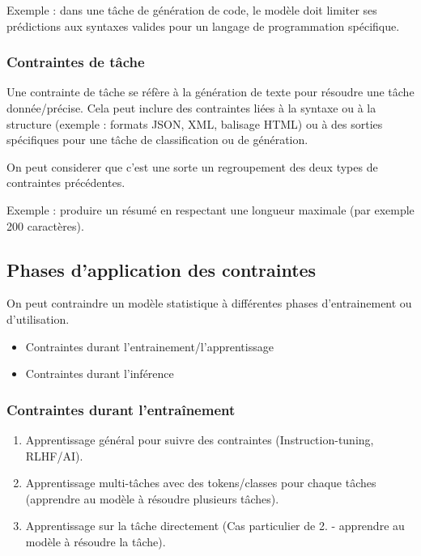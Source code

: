 Exemple : dans une tâche de génération de code, le modèle doit limiter
ses prédictions aux syntaxes valides pour un langage de programmation
spécifique.

\subsubsection{Contraintes de tâche}\label{contraintes-de-tuxe2che}

Une contrainte de tâche se réfère à la génération de texte pour résoudre
une tâche donnée/précise. Cela peut inclure des contraintes liées à la
syntaxe ou à la structure (exemple : formats JSON, XML, balisage HTML)
ou à des sorties spécifiques pour une tâche de classification ou de
génération.

On peut considerer que c'est une sorte un regroupement des deux types de
contraintes précédentes.

Exemple : produire un résumé en respectant une longueur maximale (par
exemple 200 caractères).

\subsection{Phases d'application des contraintes}\label{phases-dapplication-des-contraintes}

On peut contraindre un modèle statistique à différentes phases
d'entrainement ou d'utilisation.

\begin{itemize}
\tightlist
\item
  Contraintes durant l'entrainement/l'apprentissage
\item
  Contraintes durant l'inférence
\end{itemize}

\subsubsection{Contraintes durant l'entraînement}\label{contraintes-durant-lentrauxeenement}

\begin{enumerate}
\def\labelenumi{\arabic{enumi}.}
\tightlist
\item
  Apprentissage général pour suivre des contraintes (Instruction-tuning,
  RLHF/AI).
\item
  Apprentissage multi-tâches avec des tokens/classes pour chaque tâches
  (apprendre au modèle à résoudre plusieurs tâches).
\item
  Apprentissage sur la tâche directement (Cas particulier de 2. -
  apprendre au modèle à résoudre la tâche).
\end{enumerate}

